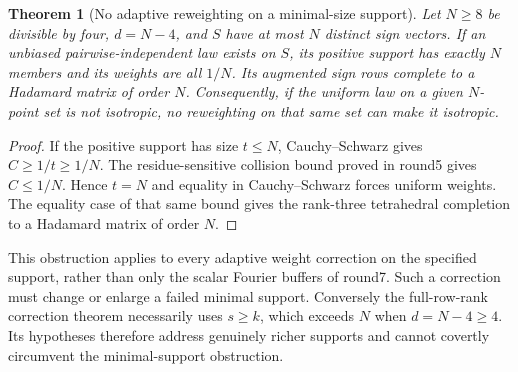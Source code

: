 \documentclass[11pt]{article}
\newtheorem{theorem}{Theorem}
\begin{document}
\begin{theorem}[No adaptive reweighting on a minimal-size support]
Let $N\ge8$ be divisible by four, $d=N-4$, and $S$ have at most $N$
distinct sign vectors. If an unbiased pairwise-independent law exists
on $S$, its positive support has exactly $N$ members and its weights
are all $1/N$. Its augmented sign rows complete to a Hadamard matrix
of order $N$.
Consequently, if the uniform law on a given $N$-point set is not
isotropic, no reweighting on that same set can make it isotropic.
\end{theorem}
\begin{proof}
If the positive support has size $t\le N$, Cauchy--Schwarz gives
$C\ge1/t\ge1/N$. The residue-sensitive collision bound proved in
round5 gives $C\le1/N$. Hence $t=N$ and equality in Cauchy--Schwarz
forces uniform weights. The equality case of that same bound gives
the rank-three tetrahedral completion to a Hadamard matrix of order
$N$.
\end{proof}
This obstruction applies to every adaptive weight correction on the
specified support, rather than only the scalar Fourier buffers of
round7. Such a correction must change or enlarge a failed minimal
support. Conversely the full-row-rank correction theorem necessarily
uses $s\ge k$, which exceeds $N$ when $d=N-4\ge4$. Its hypotheses
therefore address genuinely richer supports and cannot covertly
circumvent the minimal-support obstruction.
\end{document}
